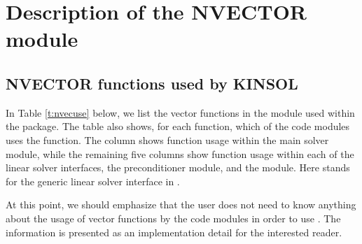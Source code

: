 \chapter{Description of the NVECTOR module}\label{s:nvector}



\section{NVECTOR functions used by KINSOL}

In Table \ref{t:nvecuse} below, we list the vector functions in the
{\nvector} module used within the {\kinsol} package.
The table also shows, for each function, which of the code modules uses
the function. The {\kinsol} column shows function usage within the main
solver module, while the remaining five columns show function
usage within each of the {\kinsol} linear solver interfaces,
the {\kinbbdpre} preconditioner module, and the {\fkinsol} module.
Here {\kinls} stands for the generic linear solver interface in {\kinsol}.

At this point, we should emphasize that the {\kinsol} user does not need to know
anything about the usage of vector functions by the {\kinsol} code modules in order
to use {\kinsol}. The information is presented as an implementation detail for the
interested reader.

